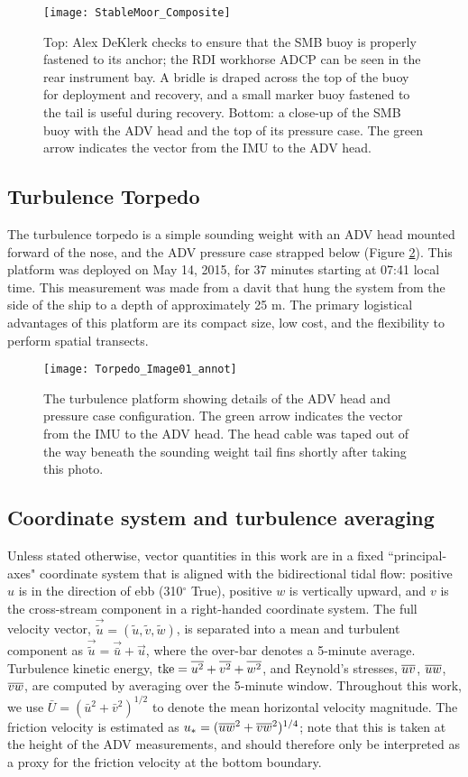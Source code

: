 \begin{figure}[t]
  \centering
  \texttt{[image: StableMoor\_Composite]}
  \caption{Top: Alex DeKlerk checks to ensure that the SMB buoy is properly fastened to its anchor; the RDI workhorse ADCP can be seen in the rear instrument bay. A bridle is draped across the top of the buoy for deployment and recovery, and a small marker buoy fastened to the tail is useful during recovery.  Bottom: a close-up of the SMB buoy with the ADV head and the top of its pressure case. The green arrow indicates the vector from the IMU to the ADV head. 
}
  \label{fig:SM}
\end{figure}

\subsection{Turbulence Torpedo}

The turbulence torpedo is a simple sounding weight with an ADV head mounted forward of the nose, and the ADV pressure case strapped below (Figure \ref{fig:torpedo}). This platform was deployed on May 14, 2015, for 37 minutes starting at 07:41 local time.  This measurement was made from a davit that hung the system from the side of the ship to a depth of approximately 25 m. The primary logistical advantages of this platform are its compact size, low cost, and the flexibility to perform spatial transects.  

\begin{figure}[th]
  \centering
  \texttt{[image: Torpedo\_Image01\_annot]}
  \caption{The turbulence platform showing details of the ADV head and pressure case configuration. The green arrow indicates the vector from the IMU to the ADV head. The head cable was taped out of the way beneath the sounding weight tail fins shortly after taking this photo.}
  \label{fig:torpedo}
\end{figure}

\subsection{Coordinate system and turbulence averaging}

Unless stated otherwise, vector quantities in this work are in a fixed ``principal-axes" coordinate system that is aligned with the bidirectional tidal flow: positive $u$ is in the direction of ebb (310$^\circ$ True), positive $w$ is vertically upward, and $v$ is the cross-stream component in a right-handed coordinate system. The full velocity vector, $\vec{\tilde{u}} = (\tilde{u}, \tilde{v}, \tilde{w})$, is separated into a mean and turbulent component as $\vec{\tilde{u}} = \vec{\bar{u}} + \vec{u}$, where the over-bar denotes a 5-minute average. Turbulence kinetic energy, $\mathrm{tke} = \overline{u^2} + \overline{v^2}+\overline{w^2}$, and Reynold's stresses, $\overline{uv}$, $\overline{uw}$, $\overline{vw}$, are computed by averaging over the 5-minute window.  Throughout this work, we use $\bar{U} = (\bar{u}^2+\bar{v}^2)^{1/2}$ to denote the mean horizontal velocity magnitude. The friction velocity is estimated as $u_* = (\overline{uw}^2+\overline{vw}^2)^{1/4}$; note that this is taken at the height of the ADV measurements, and should therefore only be interpreted as a proxy for the friction velocity at the bottom boundary.

